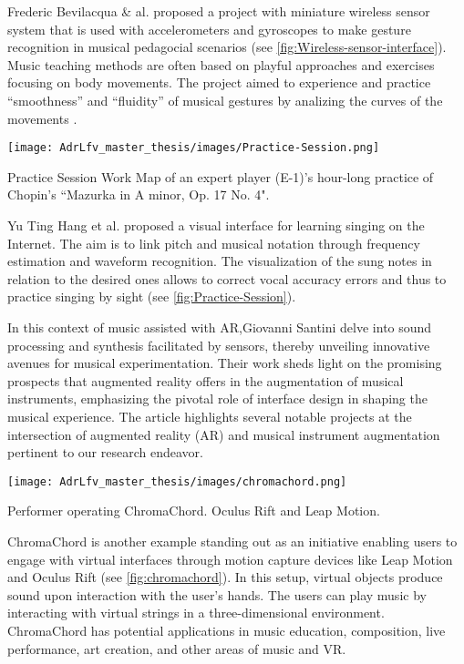 Frederic Bevilacqua \& al. proposed a project with miniature wireless sensor system that is used with accelerometers and gyroscopes to make gesture recognition in musical pedagocial scenarios (see \ref{fig:Wireless-sensor-interface}). Music teaching methods are often based on playful approaches and exercises focusing on body movements. The project aimed to experience and practice “smoothness” and “fluidity” of musical gestures by analizing the curves of the movements \cite{bevilacqua2007wireless}.

\begin{marginfigure}
    \centering
    \texttt{[image: AdrLfv\_master\_thesis/images/Practice-Session.png]}
    \caption{Practice Session Work Map of an expert player (E-1)’s hour-long practice of Chopin’s “Mazurka in A minor, Op. 17 No. 4".}
    \label{fig:Practice-Session}
\end{marginfigure}

Yu Ting Hang et al. proposed a visual interface for learning singing on the Internet. The aim is to link pitch and musical notation through frequency estimation and waveform recognition. The visualization of the sung notes in relation to the desired ones allows to correct vocal accuracy errors and thus to practice singing by sight \cite{huang2016visualized} (see \ref{fig:Practice-Session}).

In this context of music assisted with AR,Giovanni Santini \cite{santini_giovanni_2020_4813449} delve into sound processing and synthesis facilitated by sensors, thereby unveiling innovative avenues for musical experimentation. Their work sheds light on the promising prospects that augmented reality offers in the augmentation of musical instruments, emphasizing the pivotal role of interface design in shaping the musical experience.
The article highlights several notable projects at the intersection of augmented reality (AR) and musical instrument augmentation pertinent to our research endeavor. 

\begin{marginfigure}
    \centering
    \texttt{[image: AdrLfv\_master\_thesis/images/chromachord.png]}
    \caption{Performer operating ChromaChord. Oculus Rift and Leap Motion.}
    \label{fig:chromachord}
\end{marginfigure}

ChromaChord \cite{fillwalk2015chromachord} is another example standing out as an initiative enabling users to engage with virtual interfaces through motion capture devices like Leap Motion and Oculus Rift (see \ref{fig:chromachord}). In this setup, virtual objects produce sound upon interaction with the user's hands. The users can play music by interacting with virtual strings in a three-dimensional environment. ChromaChord has potential applications in music education, composition, live performance, art creation, and other areas of music and VR.

